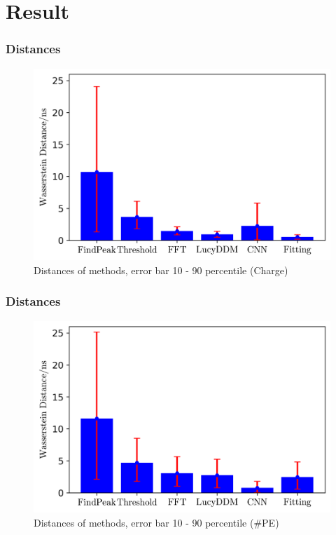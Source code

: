 \documentclass{beamer}
\begin{document}
\section{Result}
\begin{frame}
\frametitle{Distances}
\begin{figure}
    \centering
    \caption{Distances of methods, error bar 10 - 90 percentile (Charge)}
    \includegraphics[width=1.0\linewidth]{img/summarycharge.png}
\end{figure}
\end{frame}

\begin{frame}
\frametitle{Distances}
\begin{figure}
    \centering
    \caption{Distances of methods, error bar 10 - 90 percentile (\#PE)}
    \includegraphics[width=1.0\linewidth]{img/summarypenum.png}
\end{figure}
\end{frame}
\end{document}
